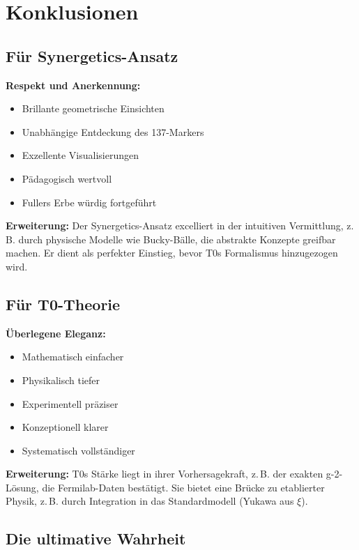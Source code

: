 \documentclass[12pt,a4paper]{article}
\newcommand{\xipar}{\xi}
\begin{document}
	\section{Konklusionen}
	
	\subsection{Für Synergetics-Ansatz}
	
	\textbf{Respekt und Anerkennung:}
	\begin{itemize}
		\item Brillante geometrische Einsichten
		\item Unabhängige Entdeckung des 137-Markers
		\item Exzellente Visualisierungen
		\item Pädagogisch wertvoll
		\item Fullers Erbe würdig fortgeführt
	\end{itemize}
	
	\textbf{Erweiterung:} Der Synergetics-Ansatz excelliert in der intuitiven Vermittlung, z.\,B. durch physische Modelle wie Bucky-Bälle, die abstrakte Konzepte greifbar machen. Er dient als perfekter Einstieg, bevor T0s Formalismus hinzugezogen wird.
	
	\subsection{Für T0-Theorie}
	
	\textbf{Überlegene Eleganz:}
	\begin{itemize}
		\item Mathematisch einfacher
		\item Physikalisch tiefer
		\item Experimentell präziser
		\item Konzeptionell klarer
		\item Systematisch vollständiger
	\end{itemize}
	
	\textbf{Erweiterung:} T0s Stärke liegt in ihrer Vorhersagekraft, z.\,B. der exakten g-2-Lösung, die Fermilab-Daten bestätigt. Sie bietet eine Brücke zu etablierter Physik, z.\,B. durch Integration in das Standardmodell (Yukawa aus $\xipar$).
	
	\subsection{Die ultimative Wahrheit}
	
\end{document}
